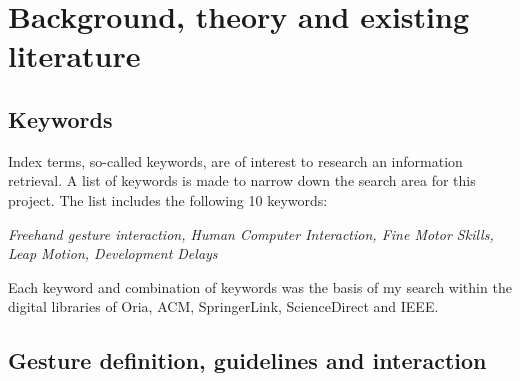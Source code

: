 \chapter{Background, theory and existing literature}
\label{chap:background}


\section{Keywords}
\label{sec:keywords}
Index terms, so-called keywords, are of interest to research an information retrieval. A list of keywords is made to narrow down the search area for this project. The list includes the following 10 keywords: 
\newline

\textit{Freehand gesture interaction, Human Computer Interaction, Fine Motor Skills, Leap Motion, Development Delays}
\newline

Each keyword and combination of keywords was the basis of my search within the digital libraries of Oria, ACM, SpringerLink, ScienceDirect and IEEE.

  

\section{Gesture definition, guidelines and interaction}
\label{sec:gesture}


